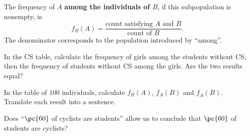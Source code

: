 \begin{keypoint}[Definition]
The frequency of $A$ \textbf{among the individuals of $B$}, if this subpopulation is nonempty, is
\[f_B(A)=\frac{\text{count satisfying }A\text{ and }B}{\text{count of }B}.\]
The denominator corresponds to the population introduced by ``among''.
\end{keypoint}
\begin{example}In the CS table, calculate the frequency of girls among the students without CS, then the frequency of students without CS among the girls. Are the two results equal?\end{example}
\begin{example}In the table of $100$ individuals, calculate $f_B(A)$, $f_A(B)$ and $f_{\overline A}(B)$. Translate each result into a sentence.\end{example}
\begin{example}Does ``$\pc{60}$ of cyclists are students'' allow us to conclude that $\pc{60}$ of students are cyclists?\end{example}

